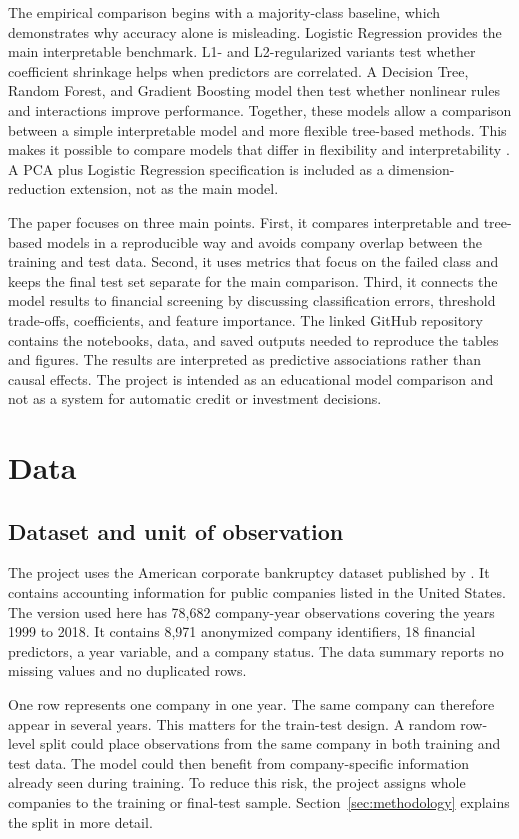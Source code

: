 \documentclass[11pt,a4paper]{article}
\begin{document}
The empirical comparison begins with a majority-class baseline, which
demonstrates why accuracy alone is misleading. Logistic Regression provides the
main interpretable benchmark. L1- and L2-regularized variants test whether
coefficient shrinkage helps when predictors are correlated. A Decision Tree,
Random Forest, and Gradient Boosting model then test whether nonlinear rules and
interactions improve performance. Together, these models allow a comparison
between a simple interpretable model and more flexible tree-based methods. This
makes it possible to compare models that differ in flexibility and
interpretability \citep{james2023}. A PCA plus Logistic Regression
specification is included as a dimension-reduction extension, not as the main
model.

The paper focuses on three main points. First, it compares interpretable and
tree-based models in a reproducible way and avoids company overlap between the
training and test data. Second, it uses metrics that focus on the failed class
and keeps the final test set separate for the main comparison. Third, it
connects the model results to financial screening by discussing classification
errors, threshold trade-offs, coefficients, and feature importance. The linked
GitHub repository contains the notebooks, data, and saved outputs needed to
reproduce the tables and figures. The results are interpreted as predictive
associations rather than causal effects. The project is intended as an
educational model comparison and not as a system for automatic credit or
investment decisions.

\section{Data}
\label{sec:data}

\subsection{Dataset and unit of observation}

The project uses the American corporate bankruptcy dataset published by
\citet{lombardo2022}. It contains accounting information for public companies
listed in the United States. The version used here has 78,682 company-year
observations covering the years 1999 to 2018. It contains 8,971 anonymized
company identifiers, 18 financial predictors, a year variable, and a company
status. The data summary reports no missing values and no duplicated rows.

One row represents one company in one year. The same company can therefore
appear in several years. This matters for the train-test design. A random
row-level split could place observations from the same company in both training
and test data. The model could then benefit from company-specific information
already seen during training. To reduce this risk, the project assigns whole
companies to the training or final-test sample. Section~\ref{sec:methodology}
explains the split in more detail.
\end{document}

